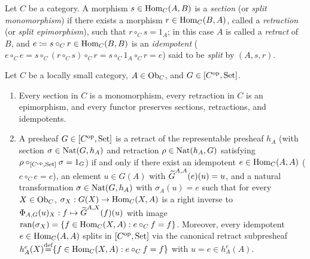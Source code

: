 \documentclass[10pt,a4paper]{article}
\begin{document}
\begin{definition}\label{def:retract}
Let $C$ be a category. A morphism $s \in {\textrm{Hom}}_C(A, B)$ is a \emph{section} (or \emph{split monomorphism}) if there exists a morphism $r \in {\textrm{Hom}}_C(B, A)$, called a \emph{retraction} (or \emph{split epimorphism}), such that $r \circ_C s = 1_A$; in this case $A$ is called a \emph{retract} of $B$, and $e \coloneqq s \circ_C r \in {\textrm{Hom}}_C(B, B)$ is an \emph{idempotent} ($e \circ_C e = s \circ_C (r \circ_C s) \circ_C r = s \circ_C 1_A \circ_C r = e$) said to be \emph{split} by $(A, s, r)$.
\end{definition}

\begin{theorem}\label{thm:retract_yoneda}
Let $C$ be a locally small category, $A \in {\textrm{Ob}}_C$, and $G \in [C^{\textrm{op}}, {\textrm{Set}}]$.
\begin{enumerate}
\item Every section in $C$ is a monomorphism, every retraction in $C$ is an epimorphism, and every functor preserves sections, retractions, and idempotents.
\item A presheaf $G \in [C^{\textrm{op}}, {\textrm{Set}}]$ is a retract of the representable presheaf $h_A$ (with section $\sigma \in {\textrm{Nat}}(G, h_A)$ and retraction $\rho \in {\textrm{Nat}}(h_A, G)$ satisfying $\rho \circ_{[C^{\textrm{op}},{\textrm{Set}}]} \sigma = 1_G$) if and only if there exist an idempotent $e \in {\textrm{Hom}}_C(A, A)$ ($e \circ_C e = e$), an element $u \in G(A)$ with ${\widetilde{G}\textrm{}}^{A,A}(e)(u) = u$, and a natural transformation $\sigma \in {\textrm{Nat}}(G, h_A)$ with $\sigma_A(u) = e$ such that for every $X \in {\textrm{Ob}}_C$, $\sigma_X : G(X) \to {\textrm{Hom}}_C(X, A)$ is a right inverse to $\Phi_{A,G}(u)_X : f \mapsto {\widetilde{G}\textrm{}}^{A,X}(f)(u)$ with image ${\textrm{ran}}(\sigma_X) = \{f \in {\textrm{Hom}}_C(X, A) : e \circ_C f = f\}$. Moreover, every idempotent $e \in {\textrm{Hom}}_C(A, A)$ splits in $[C^{\textrm{op}}, {\textrm{Set}}]$ via the canonical retract subpresheaf $h_A^e(X) {\stackrel{{\textrm{def}}}{=}} \{f \in {\textrm{Hom}}_C(X, A) : e \circ_C f = f\}$ with $u = e \in h_A^e(A)$.
\end{enumerate}
\end{theorem}
\myprf
\end{document}
